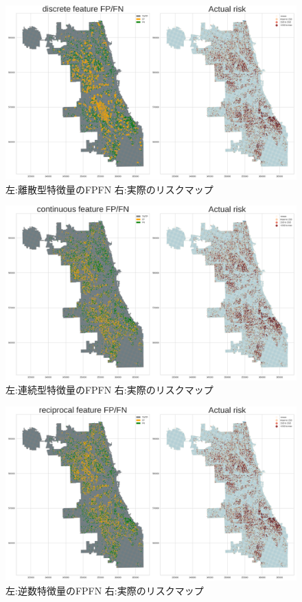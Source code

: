 \documentclass[12pt,a4paper,oneside]{jsbook}
\theoremstyle{plain}
\begin{document}
\begin{figure}
  \centering %
  \includegraphics[scale=0.25]{./non-crime-val-figure/discrete_fnp.png}
  \caption{左:離散型特徴量のFPFN 右:実際のリスクマップ}
  \label{fig:nc-val-discrete-fnp}
\end{figure}

\begin{figure}
  \centering %
  \includegraphics[scale=0.25]{./non-crime-val-figure/continuous_fnp.png}
  \caption{左:連続型特徴量のFPFN 右:実際のリスクマップ}
  \label{fig:nc-val-continuous-fnp}
\end{figure}

\begin{figure}
  \centering %
  \includegraphics[scale=0.25]{./non-crime-val-figure/reciprocal_fnp.png}
  \caption{左:逆数特徴量のFPFN 右:実際のリスクマップ}
  \label{fig:nc-val-reciprocal-fnp}
\end{figure}
\end{document}
